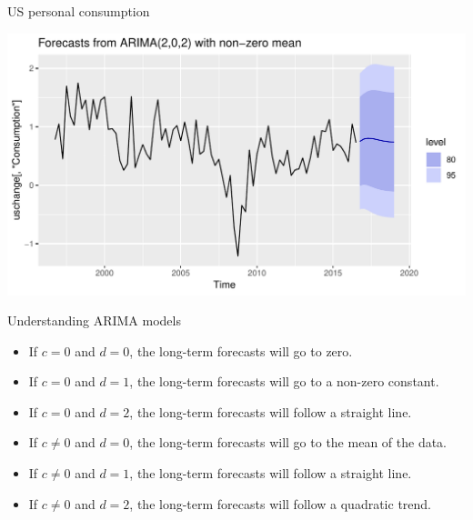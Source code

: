\documentclass[14pt,ignorenonframetext,]{beamer}
\newenvironment{Shaded}{\begin{snugshade}}{\end{snugshade}}
\newcommand{\KeywordTok}[1]{\textcolor[rgb]{0.13,0.29,0.53}{\textbf{#1}}}
\newcommand{\DataTypeTok}[1]{\textcolor[rgb]{0.13,0.29,0.53}{#1}}
\newcommand{\DecValTok}[1]{\textcolor[rgb]{0.00,0.00,0.81}{#1}}
\newcommand{\StringTok}[1]{\textcolor[rgb]{0.31,0.60,0.02}{#1}}
\newcommand{\OperatorTok}[1]{\textcolor[rgb]{0.81,0.36,0.00}{\textbf{#1}}}
\newcommand{\NormalTok}[1]{#1}
\begin{document}
\begin{frame}[fragile]{US personal consumption}

\fontsize{12}{15}\sf

\begin{Shaded}
\end{Shaded}

\includegraphics{week_5_arima_files/figure-beamer/unnamed-chunk-27-1.pdf}

\end{frame}

\begin{frame}{Understanding ARIMA models}

\fontsize{14}{16}\sf

\begin{itemize}
\item
  If \(c=0\) and \(d=0\), the long-term forecasts will go to zero.
\item
  If \(c=0\) and \(d=1\), the long-term forecasts will go to a non-zero
  constant.
\item
  If \(c=0\) and \(d=2\), the long-term forecasts will follow a straight
  line.
\item
  If \(c\ne0\) and \(d=0\), the long-term forecasts will go to the mean
  of the data.
\item
  If \(c\ne0\) and \(d=1\), the long-term forecasts will follow a
  straight line.
\item
  If \(c\ne0\) and \(d=2\), the long-term forecasts will follow a
  quadratic trend.
\end{itemize}

\end{frame}
\end{document}
